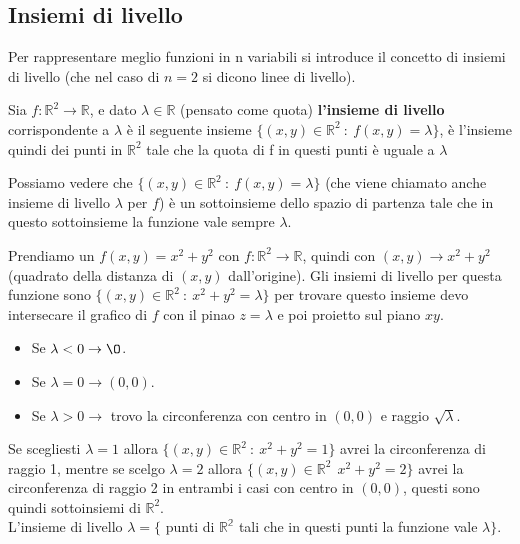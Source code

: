 \subsection{Insiemi di livello}
Per rappresentare meglio funzioni in n variabili si introduce il concetto di insiemi di livello (che nel caso di $n=2$ si dicono linee di livello). 
\begin{definition}
Sia $f: \mathbb{R}^2 \to \mathbb{R}$, e dato $\lambda \in \mathbb{R}$ (pensato come quota) \textbf{l'insieme di livello} corrispondente a $\lambda$ è il seguente insieme
$\{(x,y) \in \mathbb{R}^2 \::\: f(x,y) = \lambda\}$, è l'insieme quindi dei punti in $\mathbb{R}^2$ tale che la quota di f in questi punti è uguale a $\lambda$
\end{definition}
\hspace{-15pt}Possiamo vedere che $\{(x,y) \in \mathbb{R}^2 \::\: f(x,y) = \lambda\}$ (che viene chiamato anche insieme di livello $\lambda$ per $f$) è un sottoinsieme dello spazio di partenza tale che in questo sottoinsieme la funzione vale sempre $\lambda$.

\begin{example}\label{ess-insiemi-livello-1}
Prendiamo un $f(x,y) = x^2 + y^2$ con $f: \mathbb{R}^2 \to \mathbb{R}$, quindi con $(x,y) \to x^2 + y^2$ (quadrato della distanza di $(x,y)$ dall'origine). Gli insiemi di livello per questa funzione sono $\{(x,y) \in \mathbb{R}^2 \::\: x^2 + y^2 = \lambda\}$ per trovare questo insieme devo intersecare il grafico di $f$ con il pinao $z = \lambda$ e poi proietto sul piano $xy$.
\begin{itemize}
    \item Se $\lambda < 0 \to \O$.
    \item Se $\lambda = 0 \to (0,0)$.
    \item Se $\lambda > 0 \to$ trovo la circonferenza con centro in $(0,0)$ e raggio $\sqrt{\lambda}$.
\end{itemize}
Se scegliesti $\lambda = 1$ allora $\{(x,y) \in \mathbb{R}^2 \::\: x^2 + y^2 = 1\}$ avrei la circonferenza di raggio 1, mentre se scelgo $\lambda = 2$ allora $\{(x,y) \in \mathbb{R}^2 \:\: x^2+y^2 = 2\}$ avrei la circonferenza di raggio 2 in entrambi i casi con centro in $(0,0)$, questi sono quindi sottoinsiemi di $\mathbb{R}^2$. \\
L'insieme di livello $\lambda = \{$ punti di $\mathbb{R^2}$ tali che in questi punti la funzione vale $\lambda \}$.
\end{example}

